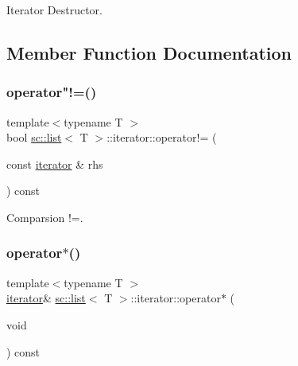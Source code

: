 Iterator Destructor. 



\subsection{Member Function Documentation}
\mbox{\label{classsc_1_1list_1_1iterator_aa8328f0336cb54e2c2fbd3925db7e88b}} 
\subsubsection{\texorpdfstring{operator"!=()}{operator!=()}}
{\footnotesize\ttfamily template$<$typename T $>$ \\
bool \hyperlink{classsc_1_1list}{sc\+::list}$<$ T $>$\+::iterator\+::operator!= (\begin{DoxyParamCaption}\item[{const \hyperlink{classsc_1_1list_1_1iterator}{iterator} \&}]{rhs }\end{DoxyParamCaption}) const\hspace{0.3cm}{\ttfamily [inline]}}



Comparsion !=. 

\mbox{\label{classsc_1_1list_1_1iterator_af844d846b7182ef0ac0319ac1908e0b9}} 
\subsubsection{\texorpdfstring{operator$\ast$()}{operator*()}\hspace{0.1cm}{\footnotesize\ttfamily [1/2]}}
{\footnotesize\ttfamily template$<$typename T $>$ \\
\hyperlink{classsc_1_1list_1_1iterator}{iterator}\& \hyperlink{classsc_1_1list}{sc\+::list}$<$ T $>$\+::iterator\+::operator$\ast$ (\begin{DoxyParamCaption}\item[{void}]{ }\end{DoxyParamCaption}) const\hspace{0.3cm}{\ttfamily [inline]}}



